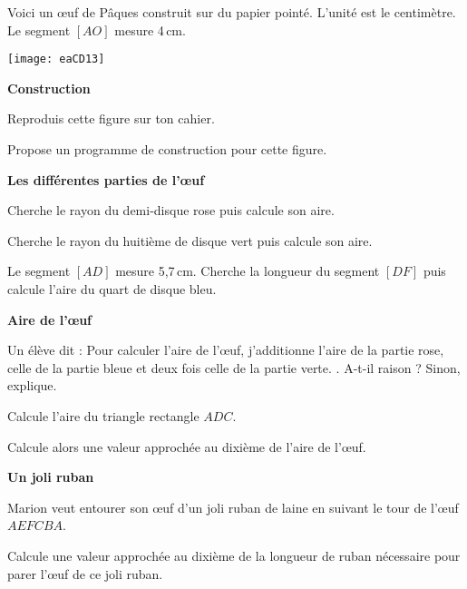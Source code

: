 \begin{exercice}
Voici un œuf de Pâques construit sur du papier pointé. L'unité est le centimètre. Le segment $[AO]$ mesure 4\,cm.

\begin{center}
    \texttt{[image: eaCD13]}
\end{center}

\begin{center}\textbf{Construction}\end{center}

\begin{colenumerate}{1} 
\item Reproduis cette figure sur ton cahier. 
\item Propose un programme de construction pour cette figure.

\begin{center}\textbf{Les différentes parties de l'œuf}\end{center}

\item Cherche le rayon du demi-disque rose puis calcule son aire.
\item Cherche le rayon du huitième de disque vert puis calcule son aire.
\item Le segment $[AD]$ mesure 5,7\,cm. Cherche la longueur du segment $[DF]$ puis calcule l'aire du quart de disque bleu. 

\begin{center}\textbf{Aire de l'œuf}\end{center}


\item Un élève dit : \og Pour calculer l’aire de l'œuf, j’additionne l’aire de la partie rose, celle de la partie bleue et deux fois celle de la partie verte. \fg. A-t-il raison ? Sinon, explique.
\item Calcule l'aire du triangle rectangle $ADC$. 
\item Calcule alors une valeur approchée au dixième de l’aire de l'œuf.
 
\begin{center}\textbf{Un joli ruban}\end{center}

Marion veut entourer son œuf d'un joli ruban de laine en suivant le tour de l'œuf $AEFCBA$. 
\item Calcule une valeur approchée au dixième de la longueur de ruban nécessaire pour parer l'œuf de ce joli ruban.
\end{colenumerate} 
\end{exercice}

